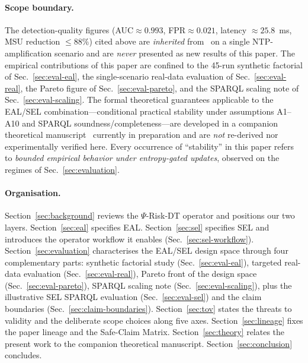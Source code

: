 \documentclass[runningheads]{llncs}
\newcommand{\psiop}{\ensuremath{\Psi}}
\begin{document}
\paragraph{Scope boundary.}
The detection-quality figures (AUC$\approx 0.993$, FPR$\approx 0.021$,
latency $\approx 25.8$~ms, MSU reduction $\leq 88\%$) cited above are
\emph{inherited} from~\cite{paper3} on a single NTP-amplification
scenario and are \emph{never} presented as new results of this paper.
The empirical contributions of this paper are confined to the 45-run
synthetic factorial of Sec.~\ref{sec:eval-eal}, the single-scenario
real-data evaluation of Sec.~\ref{sec:eval-real}, the Pareto figure of
Sec.~\ref{sec:eval-pareto}, and the SPARQL scaling note of
Sec.~\ref{sec:eval-scaling}. The formal theoretical guarantees applicable
to the EAL/SEL combination---conditional practical stability under
assumptions A1--A10 and SPARQL soundness/completeness---are developed
in a companion theoretical manuscript~\cite{paper5} currently in
preparation and are \emph{not} re-derived nor experimentally verified
here. Every occurrence of ``stability'' in this paper refers to
\emph{bounded empirical behavior under entropy-gated updates}, observed
on the regimes of Sec.~\ref{sec:evaluation}.

\paragraph{Organisation.} Section~\ref{sec:background} reviews the
$\psiop$-Risk-DT operator and positions our two layers.
Section~\ref{sec:eal} specifies EAL. Section~\ref{sec:sel} specifies SEL
and introduces the operator workflow it enables
(Sec.~\ref{sec:sel-workflow}).
Section~\ref{sec:evaluation} characterises the EAL/SEL design space
through four complementary parts: synthetic factorial study
(Sec.~\ref{sec:eval-eal}), targeted real-data evaluation
(Sec.~\ref{sec:eval-real}), Pareto front of the design space
(Sec.~\ref{sec:eval-pareto}), SPARQL scaling note
(Sec.~\ref{sec:eval-scaling}), plus the illustrative SEL SPARQL
evaluation (Sec.~\ref{sec:eval-sel}) and the claim boundaries
(Sec.~\ref{sec:claim-boundaries}). Section~\ref{sec:tov} states the
threats to validity and the deliberate scope choices along five axes.
Section~\ref{sec:lineage} fixes the paper lineage and the Safe-Claim
Matrix. Section~\ref{sec:theory} relates the present work to the
companion theoretical manuscript. Section~\ref{sec:conclusion}
concludes.

\end{document}
